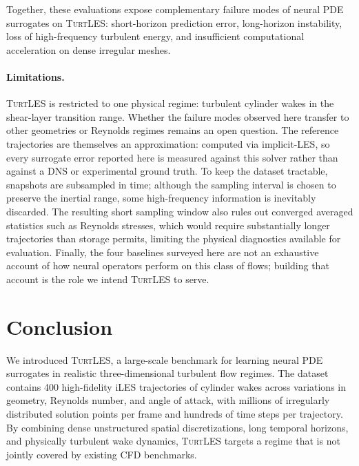 \documentclass{article}
\begin{document}
Together, these evaluations expose complementary failure modes of neural PDE surrogates on \textsc{TurtLES}: short-horizon prediction error, long-horizon instability, loss of high-frequency turbulent energy, and insufficient computational acceleration on dense irregular meshes.

{\color{revcolor}
\paragraph{Limitations.}
\textsc{TurtLES} is restricted to one physical regime: turbulent cylinder wakes in the shear-layer transition range. Whether the failure modes observed here transfer to other geometries or Reynolds regimes remains an open question. The reference trajectories are themselves an approximation: computed via implicit-LES, so every surrogate error reported here is measured against this solver rather than against a DNS or experimental ground truth. To keep the dataset tractable, snapshots are subsampled in time; although the sampling interval is chosen to preserve the inertial range, some high-frequency information is inevitably discarded. The resulting short sampling window also rules out converged averaged statistics such as Reynolds stresses, which would require substantially longer trajectories than storage permits, limiting the physical diagnostics available for evaluation. Finally, the four baselines surveyed here are not an exhaustive account of how neural operators perform on this class of flows; building that account is the role we intend \textsc{TurtLES} to serve.}


\section{Conclusion}

We introduced \textsc{TurtLES}, a large-scale benchmark for learning neural PDE surrogates in realistic three-dimensional turbulent flow regimes. The dataset contains \textcolor{revcolor}{400} high-fidelity iLES trajectories of cylinder wakes across variations in geometry, Reynolds number, and angle of attack, with millions of irregularly distributed solution points per frame and hundreds of time steps per trajectory. By combining dense unstructured spatial discretizations, long temporal horizons, and physically turbulent wake dynamics, \textsc{TurtLES} targets a regime that is not jointly covered by existing CFD benchmarks.
\end{document}
